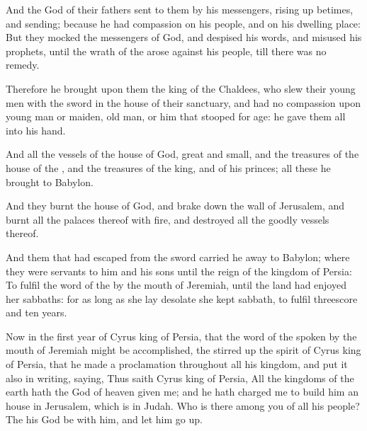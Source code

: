 \Verse And the \LORD God of their fathers sent to them by his messengers, rising up betimes, and sending; because he had compassion on his people, and on his dwelling place: \Verse But they mocked the messengers of God, and despised his words, and misused his prophets, until the wrath of the \LORD arose against his people, till there was no remedy.

\Verse Therefore he brought upon them the king of the Chaldees, who slew their young men with the sword in the house of their sanctuary, and had no compassion upon young man or maiden, old man, or him that stooped for age: he gave them all into his hand.

\Verse And all the vessels of the house of God, great and small, and the treasures of the house of the \LORD, and the treasures of the king, and of his princes; all these he brought to Babylon.

\Verse And they burnt the house of God, and brake down the wall of Jerusalem, and burnt all the palaces thereof with fire, and destroyed all the goodly vessels thereof.

\Verse And them that had escaped from the sword carried he away to Babylon; where they were servants to him and his sons until the reign of the kingdom of Persia: \Verse To fulfil the word of the \LORD by the mouth of Jeremiah, until the land had enjoyed her sabbaths: for as long as she lay desolate she kept sabbath, to fulfil threescore and ten years.

\Verse Now in the first year of Cyrus king of Persia, that the word of the \LORD spoken by the mouth of Jeremiah might be accomplished, the \LORD stirred up the spirit of Cyrus king of Persia, that he made a proclamation throughout all his kingdom, and put it also in writing, saying, \Verse Thus saith Cyrus king of Persia, All the kingdoms of the earth hath the \LORD God of heaven given me; and he hath charged me to build him an house in Jerusalem, which is in Judah. Who is there among you of all his people?  The \LORD his God be with him, and let him go up.

